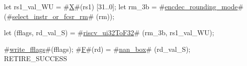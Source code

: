 let rs1_val_WU = #\hyperref[sailRISCVzX]{X}#(rs1) [31..0];
let rm_3b      = #\hyperref[sailRISCVzencdeczyroundingzymode]{encdec\_rounding\_mode}# (#\hyperref[sailRISCVzselectzyinstrzyorzyfcsrzyrm]{select\_instr\_or\_fcsr\_rm}#  (rm));

let (fflags, rd_val_S) = #\hyperref[sailRISCVzriscvzyui32ToF32]{riscv\_ui32ToF32}# (rm_3b, rs1_val_WU);

#\hyperref[sailRISCVzwritezyfflags]{write\_fflags}#(fflags);
#\hyperref[sailRISCVzF]{F}#(rd) = #\hyperref[sailRISCVznanzybox]{nan\_box}# (rd_val_S);
RETIRE_SUCCESS
